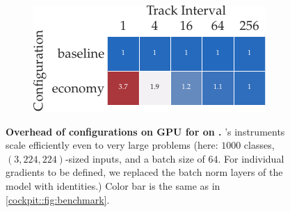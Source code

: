 \begin{figure}[t]
	\centering
  \begin{subfigure}{0.4\thesiswidewidth}
    \centering
    \includegraphics{../repos/cockpit-paper/fig/01_benchmark/output/fig_grid/benchmark_dummyimagenet_resnet50nobn_cuda_app_thesis-wide}
  \end{subfigure}

	\caption{\textbf{Overhead of \cockpittitle configurations on GPU for
      \resnetfifty on \imagenet.} \cockpit's instruments scale efficiently even
    to very large problems (here: $1000$ classes, $(3, 224, 224)$-sized inputs,
    and a batch size of $64$. For individual gradients to be defined, we
    replaced the batch norm layers of the \resnetfifty model with identities.)
    Color bar is the same as in \autoref{cockpit::fig:benchmark}.}
	\label{cockpit::fig:app_benchmark_configurations_gpu_imagenet}
\end{figure}

